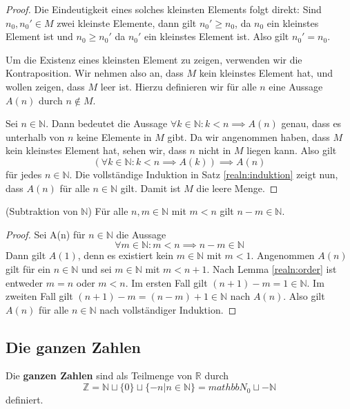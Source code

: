 \documentclass[../Analysis1_script.tex]{subfiles}
\begin{document}
\begin{proof}
	Die Eindeutigkeit eines solches kleinsten Elements folgt direkt: Sind $n_0, n_0' \in M$ zwei kleinste Elemente, dann gilt $n_0' \geq n_0$, da $n_0$ ein kleinstes Element ist und $n_0 \geq n_0'$ da $n_0'$ ein kleinstes Element ist. Also gilt $n_0' = n_0$.
	
	Um die Existenz eines kleinsten Element zu zeigen, verwenden wir die Kontraposition. Wir nehmen also an, dass $M$ kein kleinstes Element hat, und wollen zeigen, dass $M$ leer ist. Hierzu definieren wir für alle $n$ eine Aussage $A(n)$ durch $n \notin M$.
	
	Sei $n \in \mathbb{N}$. Dann bedeutet die Aussage $\forall k \in \mathbb{N} : k < n \implies A(n)$ genau, dass es unterhalb von $n$ keine Elemente in $M$ gibt. Da wir angenommen haben, dass $M$ kein kleinstes Element hat, sehen wir, dass $n$ nicht in $M$ liegen kann. Also gilt
	\begin{equation}
		(\forall k \in \mathbb{N} : k < n \implies A(k)) \implies A(n)
	\end{equation}
	für jedes $n \in \mathbb{N}$. Die vollständige Induktion in Satz \ref{realn:induktion} zeigt nun, dass $A(n)$ für alle $n \in \mathbb{N}$ gilt. Damit ist $M$ die leere Menge. 
\end{proof}

\begin{lemma}{(Subtraktion von $\mathbb{N}$)}
	Für alle $n, m \in \mathbb{N}$ mit $m < n$ gilt $n - m \in \mathbb{N}$.
\end{lemma}

\begin{proof}
	Sei A(n) für $n \in \mathbb{N}$ die Aussage
	\begin{equation}
		\forall m \in \mathbb{N}: m < n \implies n - m \in \mathbb{N}
	\end{equation}
	Dann gilt $A(1)$, denn es existiert kein $m \in \mathbb{N}$ mit $m < 1$. Angenommen $A(n)$ gilt für ein $n \in \mathbb{N}$ und sei $m \in \mathbb{N}$ mit $m < n + 1$. Nach Lemma \ref{realn:order} ist entweder $m = n$ oder $ m < n$. Im ersten Fall gilt $(n + 1) - m = 1 \in \mathbb{N}$. Im zweiten Fall gilt $(n + 1) - m = (n - m) + 1 \in \mathbb{N}$ nach $A(n)$. Also gilt $A(n)$ für alle $n \in \mathbb{N}$ nach vollständiger Induktion.
\end{proof}

\subsection{Die ganzen Zahlen}
Die \textbf{ganzen Zahlen} sind als Teilmenge von $\mathbb{R}$ durch 
\begin{equation}
	\mathbb{Z} = \mathbb{N} \sqcup \{0\} \sqcup \{-n | n \in \mathbb{N}\} = mathbb{N}_0 \sqcup -\mathbb{N}
\end{equation}
definiert.
\end{document}
